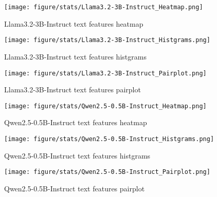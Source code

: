 
\begin{figure}[H]
    \centering
    \texttt{[image: figure/stats/Llama3.2-3B-Instruct\_Heatmap.png]}
    \caption{Llama3.2-3B-Instruct text features heatmap}
    \label{fig:human_heatmap}
\end{figure}


\begin{figure}[H]
    \centering
    \texttt{[image: figure/stats/Llama3.2-3B-Instruct\_Histgrams.png]}
    \caption{Llama3.2-3B-Instruct text features histgrams}
    \label{fig:human_hist}
\end{figure}


\begin{figure}[H]
    \centering
    \texttt{[image: figure/stats/Llama3.2-3B-Instruct\_Pairplot.png]}
    \caption{Llama3.2-3B-Instruct text features pairplot}
    \label{fig:human_pairplot}
\end{figure}




\begin{figure}[H]
    \centering
    \texttt{[image: figure/stats/Qwen2.5-0.5B-Instruct\_Heatmap.png]}
    \caption{Qwen2.5-0.5B-Instruct text features heatmap}
    \label{fig:human_heatmap}
\end{figure}

\begin{figure}[H]
    \centering
    \texttt{[image: figure/stats/Qwen2.5-0.5B-Instruct\_Histgrams.png]}
    \caption{Qwen2.5-0.5B-Instruct text features histgrams}
    \label{fig:human_hist}
\end{figure}


\begin{figure}[H]
    \centering
    \texttt{[image: figure/stats/Qwen2.5-0.5B-Instruct\_Pairplot.png]}
    \caption{Qwen2.5-0.5B-Instruct text features pairplot}
    \label{fig:human_pairplot}
\end{figure}




